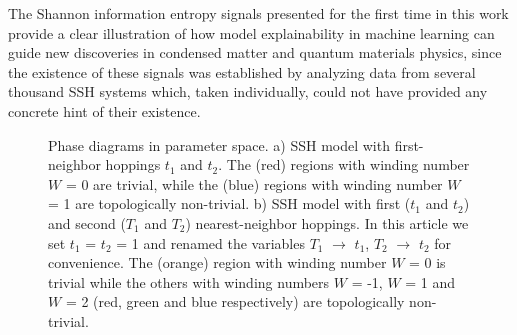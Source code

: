 \documentclass[fleqn,10pt]{wlscirep}
\begin{document}
The Shannon information entropy signals presented for the first time in this work provide a clear illustration of how model explainability in machine learning can guide new discoveries in condensed matter and quantum materials physics, since the existence of these signals was established by analyzing data from several thousand SSH systems which, taken individually, could not have provided any concrete hint of their existence. 

\begin{figure}
\centering
{}\quad
{}
\caption{Phase diagrams in parameter space. a) SSH model with first-neighbor hoppings $t_1$ and $t_2$. The (red) regions with winding number $W$ = 0 are trivial, while the (blue) regions with winding number $W$ = 1 are topologically non-trivial. b) SSH model with first ($t_1$ and $t_2$) and second ($T_1$ and $T_2$) nearest-neighbor hoppings. In this article we set $t_1$ = $t_2$ = 1 and renamed the variables $T_1$ $\rightarrow$ $t_1$, $T_2$ $\rightarrow$ $t_2$ for convenience. The (orange) region with winding number $W$ = 0 is trivial while the others with winding numbers $W$ = -1, $W$ = 1 and $W$ = 2 (red, green and blue respectively) are topologically non-trivial.}
\label{fig:phasediagrams}
\end{figure}
\end{document}
